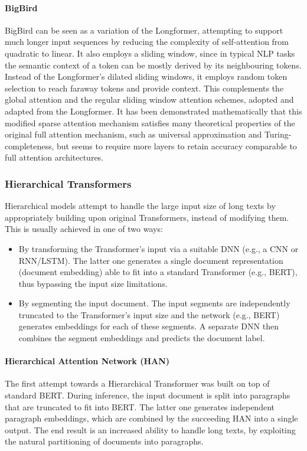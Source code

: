 \documentclass[preprint,review,10pt]{elsarticle}
\begin{document}
	\paragraph{BigBird} BigBird \cite{big_bird} can be seen as a variation of the Longformer, attempting to support much longer input sequences by reducing the complexity of self-attention from quadratic to linear. It also employs a sliding window, since in typical NLP tasks the semantic context of a token can be mostly derived by its neighbouring tokens. Instead of the Longformer's dilated sliding windows, it employs random token selection to reach faraway tokens and provide context. This complements the global attention and the regular sliding window attention schemes, adopted and adapted from the Longformer. It has been demonstrated mathematically that this modified sparse attention mechanism satisfies many theoretical properties of the original full attention mechanism, such as universal approximation and Turing-completeness, but seems to require more layers to retain accuracy comparable to full attention architectures.
	
	\subsubsection{Hierarchical Transformers}
	Hierarchical models attempt to handle the large input size of long texts by appropriately building upon original Transformers, instead of modifying them. This is usually achieved in one of two ways:
	
	\begin{itemize}
		\item By transforming the Transformer's input via a suitable DNN (e.g., a CNN or RNN/LSTM). The latter one generates a single document representation (document embedding) able to fit into a standard Transformer (e.g., BERT), thus bypassing the input size limitations.
		\item By segmenting the input document. The input segments are independently truncated to the Transformer's input size and the network (e.g., BERT) generates embeddings for each of these segments. A separate DNN then combines the segment embeddings and predicts the document label.
	\end{itemize}
	
	\paragraph{Hierarchical Attention Network (HAN)} The first attempt towards a Hierarchical Transformer \cite{ion_han} \cite{zichao} was built on top of standard BERT. During inference, the input document is split into paragraphs that are truncated to fit into BERT. The latter one generates independent paragraph embeddings, which are combined by the succeeding HAN into a single output. The end result is an increased ability to handle long texts, by exploiting the natural partitioning of documents into paragraphs.
	
\end{document}
